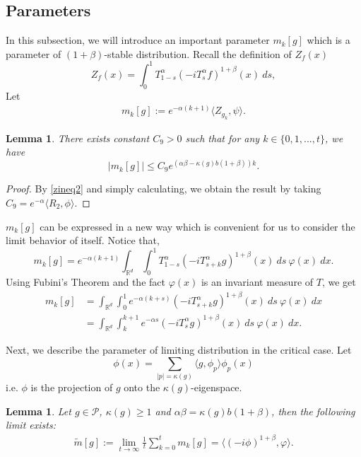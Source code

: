 \documentclass[12pt, a4paper]{amsart}
\newtheorem{lem}[thm]{Lemma}
\theoremstyle{definition}
\numberwithin{equation}{section}
\begin{document}
\subsection{Parameters}
 In this subsection, we will introduce an important parameter $m_k[g]$ which is a parameter of $(1+\beta)$-stable distribution. Recall the definition of $Z_f(x)$
 $$Z_f(x)=\int_0^1 T^{\alpha}_{1-s}(-iT_s^{\alpha}f)^{1+\beta}(x)~ds,$$
 Let
 \begin{align}
      m_k[g]:=e^{-\alpha(k+1)}\langle Z_{g_k},\psi\rangle.
 \end{align}
\begin{lem}\label{mgineq1}
There exists constant $C_9>0$ such that for any $k\in \{0,1,...,t\}$, we have
$$|m_k[g]|\leq C_9 e^{(\alpha\beta-\kappa(g)b(1+\beta))k}.$$
\end{lem}
\begin{proof}
    By \eqref{zineq2} and simply calculating, we obtain the result by  taking $C_9=e^{-\alpha}\langle R_2,\phi\rangle$.
\end{proof}

$m_k[g]$ can be expressed in a new way which is convenient for us to consider the limit behavior of itself. Notice that,
$$m_k[g]=e^{-\alpha(k+1)}\int_{\mathbb{R}^d}\int_0^1 T_{1-s}^{\alpha}(-iT_{s+k}^{\alpha}g)^{1+\beta}(x)~ds~\varphi(x)~dx.$$
Using Fubini's Theorem and the fact $\varphi(x)$ is an invariant measure of $T$, we get
\begin{align}
    m_k[g]&=\int_{\mathbb{R}^d}\int_0^1 e^{-\alpha(k+s)}(-iT_{s+k}^{\alpha}g)^{1+\beta}(x)~ds~\varphi(x)~dx\nonumber\\
    &=\int_{\mathbb{R}^d}\int_k^{k+1} e^{-\alpha s}(-iT_{s}^{\alpha}g)^{1+\beta}(x)~ds~\varphi(x)~dx.\label{mkeq}
\end{align}

Next, we describe the parameter of limiting distribution in the critical case. Let
$$\phi(x)=\sum_{|p|=\kappa(g)}\langle g, \phi_p\rangle\phi_p(x)$$
i.e. $\phi$ is the projection of $g$ onto the $\kappa(g)$-eigenspace.
\begin{lem}\label{lemma210}
Let $g \in \mathcal{P}$, $\kappa(g)\geq 1$ and $\alpha\beta=\kappa(g)b(1+\beta)$, then the following limit exists:
\begin{align}
    \tilde{m}[g]:=\lim_{t\rightarrow \infty}\frac{1}{t}\sum_{k=0}^{t}m_k[g]=\langle(-i\phi)^{1+\beta},\varphi\rangle.
\end{align}
\end{lem}
\end{document}
